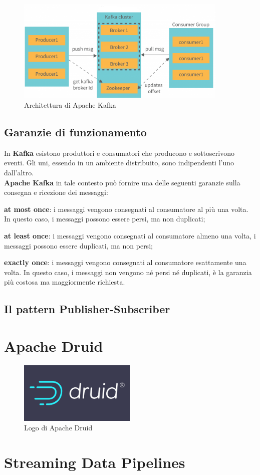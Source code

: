 \begin{figure}[h]
    \centering
    \includegraphics[width=0.9\textwidth]{images/componenti/kafka_architetcture.png}
    \caption{Architettura di Apache Kafka}
    \label{fig:kafka_architecture}
\end{figure}

\subsection{Garanzie di funzionamento}
In \textbf{Kafka} esistono produttori e consumatori che producono e sottoscrivono eventi. Gli uni, essendo in un ambiente distribuito,
sono indipendenti l’uno dall’altro. \\
\textbf{Apache Kafka} in tale contesto può fornire una delle seguenti garanzie sulla consegna e ricezione dei messaggi:
\begin{list}{*}
    \item \textbf{at most once}: i messaggi vengono consegnati al consumatore al più una volta. In questo caso, i messaggi possono essere persi, ma non duplicati;
   \item \item  \textbf{at least once}: i messaggi vengono consegnati al consumatore almeno una volta, i messaggi possono essere duplicati, ma non persi;
    \item \textbf{exactly once}: i messaggi vengono consegnati al consumatore esattamente una volta. In questo caso, i messaggi non vengono né persi né duplicati, è la garanzia più costosa ma maggiormente richiesta.
\end{list}
\subsection{Il pattern Publisher-Subscriber}

\pagebreak
\section{Apache Druid}

\begin{figure}[h]
    \centering
    \includegraphics[width=0.5\textwidth]{images/componenti/logo_druid.png}
    \caption{Logo di Apache Druid}
    \label{fig:logo_druid}
\end{figure}
\section{Streaming Data Pipelines}
\newpage
\pagestyle{empty}
\null %
\newpage